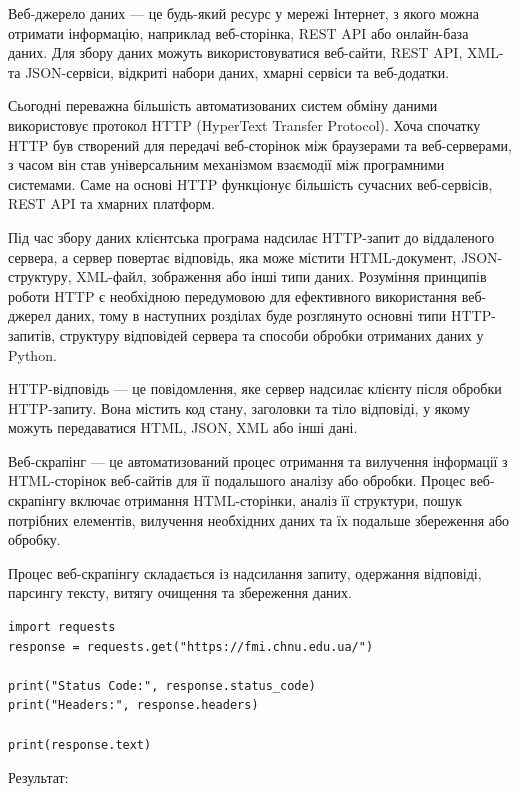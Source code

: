 Веб-джерело даних — це будь-який ресурс у мережі Інтернет, з якого можна отримати інформацію, 
наприклад веб-сторінка, REST API або онлайн-база даних. Для збору даних можуть використовуватися 
веб-сайти, REST API, XML- та JSON-сервіси, відкриті набори даних, хмарні сервіси та веб-додатки. 

Сьогодні переважна більшість автоматизованих систем обміну даними використовує протокол HTTP 
(HyperText Transfer Protocol). Хоча спочатку HTTP був створений для передачі веб-сторінок між 
браузерами та веб-серверами, з часом він став універсальним механізмом взаємодії між 
програмними системами. Саме на основі HTTP функціонує більшість сучасних веб-сервісів, 
REST API та хмарних платформ.

Під час збору даних клієнтська програма надсилає HTTP-запит до віддаленого сервера, а 
сервер повертає відповідь, яка може містити HTML-документ, JSON-структуру, XML-файл, 
зображення або інші типи даних. Розуміння принципів роботи HTTP є необхідною передумовою 
для ефективного використання веб-джерел даних, тому в наступних розділах буде розглянуто 
основні типи HTTP-запитів, структуру відповідей сервера та способи обробки отриманих даних у Python.

HTTP-відповідь — це повідомлення, яке сервер надсилає клієнту після обробки HTTP-запиту. 
Вона містить код стану, заголовки та тіло відповіді, у якому можуть передаватися HTML, JSON, 
XML або інші дані. 

Веб-скрапінг — це автоматизований процес отримання та вилучення інформації з HTML-сторінок 
веб-сайтів для її подальшого аналізу або обробки. Процес веб-скрапінгу включає отримання 
HTML-сторінки, аналіз її структури, пошук потрібних елементів, вилучення необхідних даних 
та їх подальше збереження або обробку.

Процес веб-скрапінгу складається із надсилання запиту, одержання відповіді, парсингу тексту, 
витягу очищення та збереження даних.

\begin{lstlisting}
import requests
response = requests.get("https://fmi.chnu.edu.ua/")

print("Status Code:", response.status_code)
print("Headers:", response.headers)

print(response.text)
\end{lstlisting}

Результат:

\begin{console}
Status Code: 200
Headers: {'Date': 'Fri, 12 Sep 2025 05:44:43 GMT', 'Content-Type': 'text/html; charset=utf-8' ...
\end{console}

